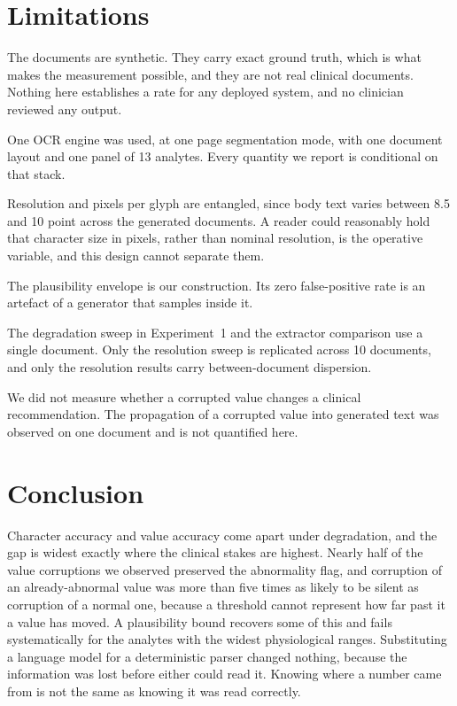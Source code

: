 \documentclass[11pt]{article}
\begin{document}
\section{Limitations}

The documents are synthetic. They carry exact ground truth, which is what makes the measurement
possible, and they are not real clinical documents. Nothing here establishes a rate for any
deployed system, and no clinician reviewed any output.

One OCR engine was used, at one page segmentation mode, with one document layout and one panel
of 13 analytes. Every quantity we report is conditional on that stack.

Resolution and pixels per glyph are entangled, since body text varies between 8.5 and 10 point
across the generated documents. A reader could reasonably hold that character size in pixels,
rather than nominal resolution, is the operative variable, and this design cannot separate them.

The plausibility envelope is our construction. Its zero false-positive rate is an artefact of a
generator that samples inside it.

The degradation sweep in Experiment~1 and the extractor comparison use a single document. Only
the resolution sweep is replicated across 10 documents, and only the resolution results carry
between-document dispersion.

We did not measure whether a corrupted value changes a clinical recommendation. The propagation
of a corrupted value into generated text was observed on one document and is not quantified
here.

\section{Conclusion}

Character accuracy and value accuracy come apart under degradation, and the gap is widest
exactly where the clinical stakes are highest. Nearly half of the value corruptions we observed
preserved the abnormality flag, and corruption of an already-abnormal value was more than five
times as likely to be silent as corruption of a normal one, because a threshold cannot represent
how far past it a value has moved. A plausibility bound recovers some of this and fails
systematically for the analytes with the widest physiological ranges. Substituting a language
model for a deterministic parser changed nothing, because the information was lost before either
could read it. Knowing where a number came from is not the same as knowing it was read
correctly.
\end{document}
